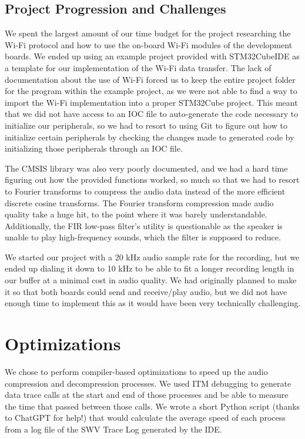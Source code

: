 \documentclass[journal]{IEEEtran}
\begin{document}
\subsection{Project Progression and Challenges}

We spent the largest amount of our time budget for the project researching the Wi-Fi protocol and how to use the on-board Wi-Fi modules of the development boards. We ended up using an example project provided with STM32CubeIDE as a template for our implementation of the Wi-Fi data transfer. The lack of documentation about the use of Wi-Fi forced us to keep the entire project folder for the program within the example project, as we were not able to find a way to import the Wi-Fi implementation into a proper STM32Cube project. This meant that we did not have access to an IOC file to auto-generate the code necessary to initialize our peripherals, so we had to resort to using Git to figure out how to initialize certain peripherals by checking the changes made to generated code by initializing those peripherals through an IOC file.

\vspace{10pt}
The CMSIS library was also very poorly documented, and we had a hard time figuring out how the provided functions worked, so much so that we had to resort to Fourier transforms to compress the audio data instead of the more efficient discrete cosine transforms. The Fourier transform compression made audio quality take a huge hit, to the point where it was barely understandable. Additionally, the FIR low-pass filter's utility is questionable as the speaker is unable to play high-frequency sounds, which the filter is supposed to reduce.

\vspace{10pt}
We started our project with a 20 kHz audio sample rate for the recording, but we ended up dialing it down to 10 kHz to be able to fit a longer recording length in our buffer at a minimal cost in audio quality. We had originally planned to make it so that both boards could send and receive/play audio, but we did not have enough time to implement this as it would have been very technically challenging.

\section{Optimizations}
We chose to perform compiler-based optimizations to speed up the audio compression and decompression processes. We used ITM debugging to generate data trace calls at the start and end of those processes and be able to measure the time that passed between those calls. We wrote a short Python script (thanks to ChatGPT for help!) that would calculate the average speed of each process from a log file of the SWV Trace Log generated by the IDE.
\end{document}
